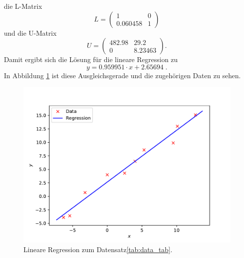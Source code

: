 \documentclass{scrartcl}
\begin{document}
die L-Matrix
\[
L = \begin{pmatrix}
       1    &   0\\
0.060458    &   1
\end{pmatrix}
\]
und die U-Matrix
\[
U = \begin{pmatrix}
 482.98 &  29.2\\
      0 & 8.23463
\end{pmatrix}.
\]
Damit ergibt sich die Lösung für die lineare Regression zu
\[
y = 0.959951\cdot x + 2.65694\; .
\]
In Abbildung \ref{fig:linreg} ist diese Ausgleichsgerade und die zugehörigen Daten zu sehen.
\begin{figure}
    \centering
    \includegraphics[width=\textwidth]{A2/build/Regression.pdf}
    \caption{Lineare Regression zum Datensatz\ref{tab:data_tab}.}
    \label{fig:linreg}
\end{figure}
\end{document}
